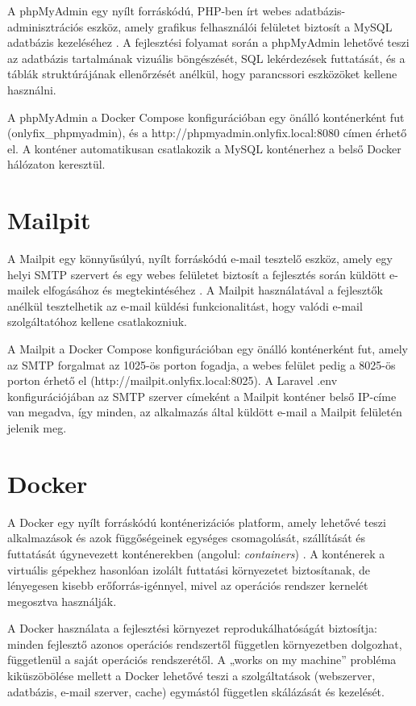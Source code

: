 \documentclass[colorlinks]{thesis-kando}
\begin{document}
A phpMyAdmin egy nyílt forráskódú, PHP-ben írt webes adatbázis-adminisztrációs eszköz, amely grafikus felhasználói felületet biztosít a MySQL adatbázis kezeléséhez \cite{ref17}. A fejlesztési folyamat során a phpMyAdmin lehetővé teszi az adatbázis tartalmának vizuális böngészését, SQL lekérdezések futtatását, és a táblák struktúrájának ellenőrzését anélkül, hogy parancssori eszközöket kellene használni.

A phpMyAdmin a Docker Compose konfigurációban egy önálló konténerként fut (onlyfix\_phpmyadmin), és a http://phpmyadmin.onlyfix.local:8080 címen érhető el. A konténer automatikusan csatlakozik a MySQL konténerhez a belső Docker hálózaton keresztül.

\section{Mailpit}

A Mailpit egy könnyűsúlyú, nyílt forráskódú e-mail tesztelő eszköz, amely egy helyi SMTP szervert és egy webes felületet biztosít a fejlesztés során küldött e-mailek elfogásához és megtekintéséhez \cite{ref18}. A Mailpit használatával a fejlesztők anélkül tesztelhetik az e-mail küldési funkcionalitást, hogy valódi e-mail szolgáltatóhoz kellene csatlakozniuk.

A Mailpit a Docker Compose konfigurációban egy önálló konténerként fut, amely az SMTP forgalmat az 1025-ös porton fogadja, a webes felület pedig a 8025-ös porton érhető el (http://mailpit.onlyfix.local:8025). A Laravel .env konfigurációjában az SMTP szerver címeként a Mailpit konténer belső IP-címe van megadva, így minden, az alkalmazás által küldött e-mail a Mailpit felületén jelenik meg.

\section{Docker}

A Docker egy nyílt forráskódú konténerizációs platform, amely lehetővé teszi alkalmazások és azok függőségeinek egységes csomagolását, szállítását és futtatását úgynevezett konténerekben (angolul: \emph{containers}) \cite{ref19}. A konténerek a virtuális gépekhez hasonlóan izolált futtatási környezetet biztosítanak, de lényegesen kisebb erőforrás-igénnyel, mivel az operációs rendszer kernelét megosztva használják.

A Docker használata a fejlesztési környezet reprodukálhatóságát biztosítja: minden fejlesztő azonos operációs rendszertől független környezetben dolgozhat, függetlenül a saját operációs rendszerétől. A „works on my machine'' probléma kiküszöbölése mellett a Docker lehetővé teszi a szolgáltatások (webszerver, adatbázis, e-mail szerver, cache) egymástól független skálázását és kezelését.
\end{document}
